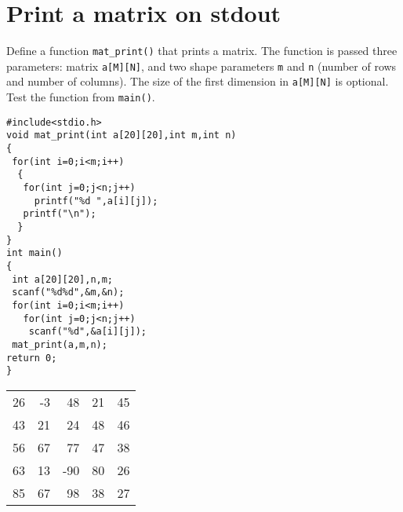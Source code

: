 \documentclass[11pt]{article}
\begin{document}
\section{Print a matrix on stdout}
\label{sec-2}
Define a function \texttt{mat\_print()} that prints a matrix. The
function is passed three parameters: matrix \texttt{a[M][N]}, and
two shape parameters \texttt{m} and \texttt{n} (number of rows and
number of columns). The size of the first dimension in
\texttt{a[M][N]} is optional. Test the function from \texttt{main()}.
\linespread{1}
\linespread{1.2}
\begin{verbatim}
#include<stdio.h>
void mat_print(int a[20][20],int m,int n)
{
 for(int i=0;i<m;i++)
  {
   for(int j=0;j<n;j++)
     printf("%d ",a[i][j]);
   printf("\n");
  }
}
int main()
{
 int a[20][20],n,m;
 scanf("%d%d",&m,&n);
 for(int i=0;i<m;i++)
   for(int j=0;j<n;j++)
    scanf("%d",&a[i][j]);
 mat_print(a,m,n);
return 0;
}
\end{verbatim}

\begin{center}
\begin{tabular}{rrrrr}
26 & -3 & 48 & 21 & 45\\
43 & 21 & 24 & 48 & 46\\
56 & 67 & 77 & 47 & 38\\
63 & 13 & -90 & 80 & 26\\
85 & 67 & 98 & 38 & 27\\
\end{tabular}
\end{center}
\end{document}
